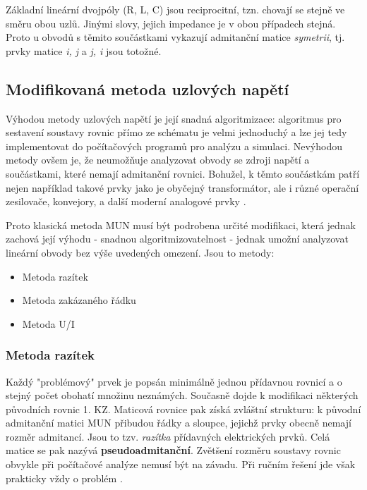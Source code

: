         Základní lineární dvojpóly (R, L, C) jsou reciprocitní, tzn. chovají se stejně ve směru 
        obou uzlů. Jinými slovy, jejich impedance je v obou případech stejná. Proto u obvodů s 
        těmito součástkami vykazují admitanční matice \emph{symetrii}, tj. prvky matice \emph{i, j} 
        a \emph{j, i} jsou totožné.

        
    \subsection{Modifikovaná metoda uzlových napětí}\label{TEO:chap_MMUN}
      Výhodou metody uzlových napětí je její snadná algoritmizace: algoritmus pro sestavení 
      soustavy rovnic přímo ze schématu je velmi jednoduchý a lze jej tedy implementovat do 
      počítačových programů pro analýzu a simulaci. Nevýhodou metody ovšem je, že neumožňuje 
      analyzovat obvody se zdroji napětí a součástkami, které nemají admitanční rovnici. Bohužel, k 
      těmto součástkám patří nejen například takové prvky jako je obyčejný transformátor, ale i 
      různé operační zesilovače, konvejory, a další moderní analogové prvky \cite[s.~77]{Biolek}.
      
      Proto klasická metoda MUN musí být podrobena určité modifikaci, která jednak zachová její 
      výhodu - snadnou algoritmizovatelnost - jednak umožní analyzovat lineární obvody bez výše 
      uvedených omezení. Jsou to metody:
      \begin{itemize}\itemsep0em
        \item Metoda razítek
        \item Metoda zakázaného řádku
        \item Metoda U/I
      \end{itemize}

      \subsubsection{Metoda razítek}
        Každý "problémový" prvek je popsán minimálně jednou přídavnou rovnicí a o stejný počet 
        obohatí množinu neznámých. Současně dojde k modifikaci některých původních rovnic 1. KZ. 
        Maticová rovnice pak získá zvláštní strukturu: k původní admitanční matici MUN přibudou 
        řádky a sloupce, jejichž prvky obecně nemají rozměr admitancí. Jsou to tzv. \emph{razítka} 
        přídavných elektrických prvků. Celá matice se pak nazývá \textbf{pseudoadmitanční}. 
        Zvětšení rozměru soustavy rovnic obvykle při počítačové analýze nemusí být na závadu. Při 
        ručním řešení jde však prakticky vždy o problém \cite[s.~78]{Biolek}.
        
